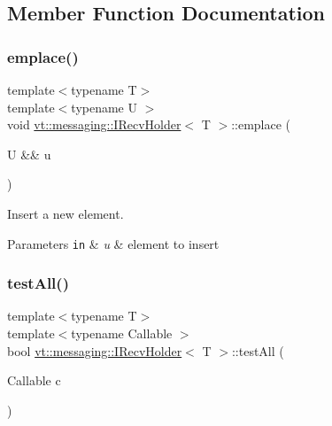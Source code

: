 \subsection{Member Function Documentation}
\mbox{\label{structvt_1_1messaging_1_1_i_recv_holder_ab81d251a84cb2c8366eb5f5052ce002c}} 
\subsubsection{\texorpdfstring{emplace()}{emplace()}}
{\footnotesize\ttfamily template$<$typename T$>$ \\
template$<$typename U $>$ \\
void \hyperlink{structvt_1_1messaging_1_1_i_recv_holder}{vt\+::messaging\+::\+I\+Recv\+Holder}$<$ T $>$\+::emplace (\begin{DoxyParamCaption}\item[{U \&\&}]{u }\end{DoxyParamCaption})\hspace{0.3cm}{\ttfamily [inline]}}



Insert a new element. 


\begin{DoxyParams}[1]{Parameters}
\mbox{\tt in}  & {\em u} & element to insert \\
\hline
\end{DoxyParams}
\mbox{\label{structvt_1_1messaging_1_1_i_recv_holder_a5c25ae9371ef928b00c42405d9d00a38}} 
\subsubsection{\texorpdfstring{test\+All()}{testAll()}}
{\footnotesize\ttfamily template$<$typename T$>$ \\
template$<$typename Callable $>$ \\
bool \hyperlink{structvt_1_1messaging_1_1_i_recv_holder}{vt\+::messaging\+::\+I\+Recv\+Holder}$<$ T $>$\+::test\+All (\begin{DoxyParamCaption}\item[{Callable}]{c }\end{DoxyParamCaption})\hspace{0.3cm}{\ttfamily [inline]}}



